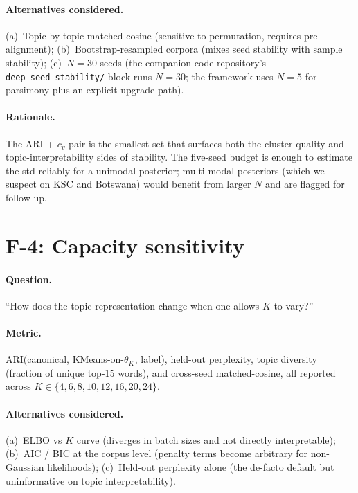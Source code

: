 \documentclass[11pt,a4paper]{article}
\begin{document}
\paragraph{Alternatives considered.} (a)~Topic-by-topic matched
cosine (sensitive to permutation, requires pre-alignment);
(b)~Bootstrap-resampled corpora (mixes seed stability with sample
stability); (c)~$N = 30$ seeds (the companion code repository's
\texttt{deep\_seed\_stability/} block runs $N = 30$; the framework
uses $N = 5$ for parsimony plus an explicit upgrade path).

\paragraph{Rationale.} The ARI + $c_v$ pair is the smallest set
that surfaces both the cluster-quality and topic-interpretability
sides of stability. The five-seed budget is enough to estimate the
std reliably for a unimodal posterior; multi-modal posteriors (which
we suspect on KSC and Botswana) would benefit from larger $N$ and
are flagged for follow-up.

\section{F-4: Capacity sensitivity}

\paragraph{Question.} ``How does the topic representation change
when one allows $K$ to vary?''

\paragraph{Metric.} ARI(canonical, KMeans-on-$\theta_K$, label),
held-out perplexity, topic diversity (fraction of unique top-15
words), and cross-seed matched-cosine, all reported across
$K \in \{4, 6, 8, 10, 12, 16, 20, 24\}$.

\paragraph{Alternatives considered.} (a)~ELBO vs $K$ curve
(diverges in batch sizes and not directly interpretable);
(b)~AIC / BIC at the corpus level (penalty terms become arbitrary
for non-Gaussian likelihoods); (c)~Held-out perplexity alone (the
de-facto default but uninformative on topic interpretability).
\end{document}
